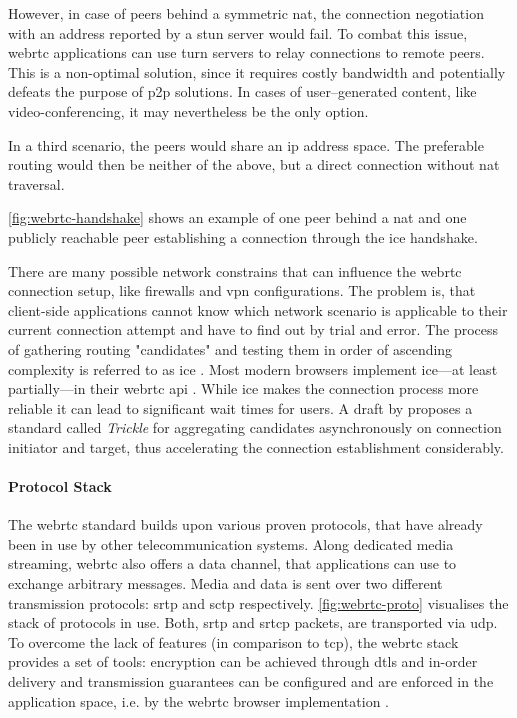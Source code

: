 However, in case of peers behind a symmetric \gls{nat}, the connection negotiation with an address reported by a \gls{stun} server would fail. To combat this issue, \gls{webrtc} applications can use \gls{turn} servers to relay connections to remote peers. This is a non-optimal solution, since it requires costly bandwidth and potentially defeats the purpose of \gls{p2p} solutions. In cases of user–generated content, like video-conferencing, it may nevertheless be the only option.

In a third scenario, the peers would share an \gls{ip} address space. The preferable routing would then be neither of the above, but a direct connection without \gls{nat} traversal.

\vref{fig:webrtc-handshake} shows an example of one peer behind a \gls{nat} and one publicly reachable peer establishing a connection through the \gls{ice} handshake.

There are many possible network constrains that can influence the \gls{webrtc} connection setup, like firewalls and \gls{vpn} configurations. The problem is, that client-side applications cannot know which network scenario is applicable to their current connection attempt and have to find out by trial and error. The process of gathering routing "candidates" and testing them in order of ascending complexity is referred to as \gls{ice} \cite{ice-rfc}. Most modern browsers implement \gls{ice}—at least partially—in their \gls{webrtc} \gls{api} \cite{webrtc-browser-compat}. While \gls{ice} makes the connection process more reliable it can lead to significant wait times for users. A draft by \citet{trickle-ice} proposes a standard called \textit{Trickle} for aggregating candidates asynchronously on connection initiator and target, thus accelerating the connection establishment considerably.

\paragraph{Protocol Stack}\label{par:webrtc-stack}
The \gls{webrtc} standard builds upon various proven protocols, that have already been in use by other telecommunication systems. Along dedicated media streaming, \gls{webrtc} also offers a data channel, that applications can use to exchange arbitrary messages. Media and data is sent over two different transmission protocols: \gls{srtp} and \gls{sctp} respectively. \vref{fig:webrtc-proto} visualises the stack of protocols in use. Both, \gls{srtp} and \gls{srtcp} packets, are transported via \gls{udp}. To overcome the lack of features (in comparison to \gls{tcp}), the \gls{webrtc} stack provides a set of tools: encryption can be achieved through \gls{dtls} and in-order delivery and transmission guarantees can be configured and are enforced in the application space, i.e. by the \gls{webrtc} browser implementation \cite[p. 319]{high-performance-browser-networking}.

